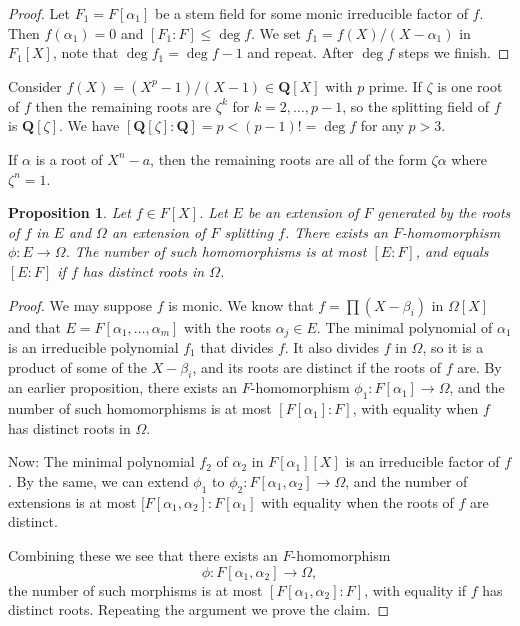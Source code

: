 \documentclass[11pt]{amsart}
\newtheorem{prop}[theo]{Proposition}
\theoremstyle{definition}
\def\QQ{\mathbf{Q}}
\begin{document}
\begin{proof}
Let $F_1 = F[\alpha_1]$ be a stem field for some monic irreducible factor of $f$.
Then $f(\alpha_1) = 0$ and $[F_1 : F] \leq \deg f$.
We set $f_1 = f(X) / (X-\alpha_1)$ in $F_1[X]$, note that $\deg f_1 = \deg f - 1$ and repeat.
After $\deg f$ steps we finish.
\end{proof}

Consider $f(X) = (X^p - 1) / (X - 1) \in \QQ[X]$ with $p$ prime.
If $\zeta$ is one root of $f$ then the remaining roots are $\zeta^k$ for $k = 2, \ldots, p-1$, so the splitting field of $f$ is $\QQ[\zeta]$.
We have $[\QQ[\zeta] : \QQ] = p < (p-1)! = \deg f$ for any $p > 3$.


If $\alpha$ is a root of $X^n - a$, then the remaining roots are all of the form $\zeta \alpha$ where $\zeta^n = 1$.


\begin{prop}
Let $f \in F[X]$.
Let $E$ be an extension of $F$ generated by the roots of $f$ in $E$ and $\Omega$ an extension of $F$ splitting $f$.
There exists an $F$-homomorphism $\phi : E \to \Omega$.
The number of such homomorphisms is at most $[E : F]$, and equals $[E:F]$ if $f$ has distinct roots in $\Omega$.
\end{prop}

\begin{proof}
We may suppose $f$ is monic.
We know that $f = \prod (X - \beta_i)$ in $\Omega[X]$ and that $E = F[\alpha_1, \ldots, \alpha_m]$ with the roots $\alpha_j \in E$.
The minimal polynomial of $\alpha_1$ is an irreducible polynomial $f_1$ that divides $f$.
It also divides $f$ in $\Omega$, so it is a product of some of the $X - \beta_i$, and its roots are distinct if the roots of $f$ are.
By an earlier proposition, there exists an $F$-homomorphism $\phi_1 : F[\alpha_1] \to \Omega$, and the number of such homomorphisms is at most $[F[\alpha_1] : F]$, with equality when $f$ has distinct roots in $\Omega$.

Now: The minimal polynomial $f_2$ of $\alpha_2$ in $F[\alpha_1][X]$ is an irreducible factor of $f$.
By the same, we can extend $\phi_1$ to $\phi_2 : F[\alpha_1, \alpha_2] \to \Omega$, and the number of extensions is at most $[F[\alpha_1, \alpha_2] : F[\alpha_1]$ with equality when the roots of $f$ are distinct.

Combining these we see that there exists an $F$-homomorphism 
\[
\phi : F[\alpha_1,\alpha_2] \to \Omega,
\]
the number of such morphisms is at most $[F[\alpha_1, \alpha_2] : F]$, with equality if $f$ has distinct roots.
Repeating the argument we prove the claim.
\end{proof}
\end{document}
